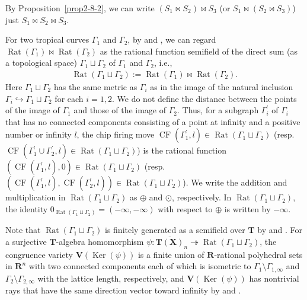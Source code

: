 \documentclass[a4paper,12pt]{amsart}
\def\Gamma{\varGamma}
\begin{document}
By Proposition~\ref{prop2-8-2}, we can write $(S_1 \bowtie S_2) \bowtie S_3$ (or $S_1 \bowtie (S_2 \bowtie S_3)$) just $S_1 \bowtie S_2 \bowtie S_3$.

For two tropical curves $\Gamma_1$ and $\Gamma_2$, by \cite[Proposition~3.11]{JuAe4} and \cite[Lemma~3.41]{JuAe=Nakajima}, we can regard $\operatorname{Rat}(\Gamma_1) \bowtie \operatorname{Rat}(\Gamma_2)$ as the rational function semifield of the direct sum (as a topological space) $\Gamma_1 \sqcup \Gamma_2$ of $\Gamma_1$ and $\Gamma_2$, i.e.,
\begin{align*}
\operatorname{Rat}(\Gamma_1 \sqcup \Gamma_2) := \operatorname{Rat}(\Gamma_1) \bowtie \operatorname{Rat}(\Gamma_2).
\end{align*}
Here $\Gamma_1 \sqcup \Gamma_2$ has the same metric as $\Gamma_i$ as in the image of the natural inclusion $\Gamma_i \hookrightarrow \Gamma_1 \sqcup \Gamma_2$ for each $i = 1, 2$.
We do not define the distance between the points of the image of $\Gamma_1$ and those of the image of $\Gamma_2$.
Thus, for a subgraph $\Gamma^{\prime}_i$ of $\Gamma_i$ that has no connected components consisting of a point at infinity and a positive number or infinity $l$, the chip firing move $\operatorname{CF}(\Gamma^{\prime}_1, l) \in \operatorname{Rat}(\Gamma_1 \sqcup \Gamma_2)$ (resp.~$\operatorname{CF}(\Gamma^{\prime}_1 \cup \Gamma^{\prime}_2, l) \in \operatorname{Rat}(\Gamma_1 \sqcup \Gamma_2)$) is the rational function $(\operatorname{CF}(\Gamma^{\prime}_1, l), 0) \in \operatorname{Rat}(\Gamma_1 \sqcup \Gamma_2)$ (resp.~$(\operatorname{CF}(\Gamma^{\prime}_1, l), \operatorname{CF}(\Gamma^{\prime}_2, l)) \in \operatorname{Rat}(\Gamma_1 \sqcup \Gamma_2)$).
We write the addition and multiplication in $\operatorname{Rat}(\Gamma_1 \sqcup \Gamma_2)$ as $\oplus$ and $\odot$, respectively.
In $\operatorname{Rat}(\Gamma_1 \sqcup \Gamma_2)$, the identity $0_{\operatorname{Rat}(\Gamma_1 \sqcup \Gamma_2)} = (-\infty, -\infty)$ with respect to $\oplus$ is written by $-\infty$.

Note that $\operatorname{Rat}(\Gamma_1 \sqcup \Gamma_2)$ is finitely generated as a semifield over $\boldsymbol{T}$ by \cite[Theorem~1.1]{JuAe3} and \cite[Lemma~3.34]{JuAe=Nakajima}.
For a surjective $\boldsymbol{T}$-algebra homomorphism $\psi : \overline{\boldsymbol{T}(\boldsymbol{X})}_n \twoheadrightarrow \operatorname{Rat}(\Gamma_1 \sqcup \Gamma_2)$, the congruence variety $\boldsymbol{V}(\operatorname{Ker}(\psi))$ is a finite union of $\boldsymbol{R}$-rational polyhedral sets in $\boldsymbol{R}^n$ with two connected components each of which is isometric to $\Gamma_1 \setminus \Gamma_{1, \infty}$ and $\Gamma_2 \setminus \Gamma_{2, \infty}$ with the lattice length, respectively, and $\boldsymbol{V}(\operatorname{Ker}(\psi))$ has nontrivial rays that have the same direction vector toward infinity by \cite[Corollary~3.19]{JuAe5} and \cite[Corollary~3.43]{JuAe=Nakajima}.
\end{document}
